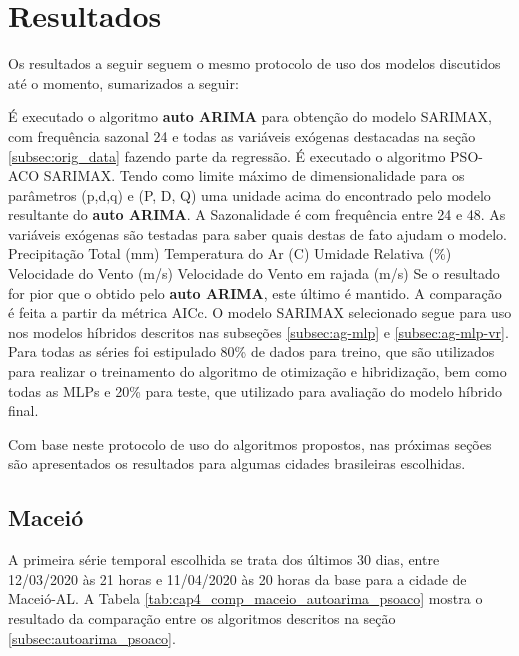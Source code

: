 \chapter{Resultados}
\label{cap:resultados}

Os resultados a seguir seguem o mesmo protocolo de uso dos modelos discutidos até o momento, sumarizados a seguir:

\begin{outline}[enumerate]
    \1 É executado o algoritmo \textbf{auto ARIMA} para obtenção do modelo SARIMAX, com frequência sazonal 24 e todas as variáveis exógenas destacadas na seção \ref{subsec:orig_data} fazendo parte da regressão.
    \1 É executado o algoritmo PSO-ACO SARIMAX.
        \2 Tendo como limite máximo de dimensionalidade para os parâmetros (p,d,q) e (P, D, Q) uma unidade acima do encontrado pelo modelo resultante do \textbf{auto ARIMA}.
        \2 A Sazonalidade é com frequência entre 24 e 48.
        \2 As variáveis exógenas são testadas para saber quais destas de fato ajudam o modelo.
            \3 Precipitação Total (mm)
            \3 Temperatura do Ar (\textdegree{}C)
            \3 Umidade Relativa (\%)
            \3 Velocidade do Vento (m/s)
            \3 Velocidade do Vento em rajada (m/s)
        \2 Se o resultado for pior que o obtido pelo \textbf{auto ARIMA}, este último é mantido. A comparação é feita a partir da métrica AICc.
    \1 O modelo SARIMAX selecionado segue para uso nos modelos híbridos descritos nas subseções \ref{subsec:ag-mlp} e \ref{subsec:ag-mlp-vr}.
        \2 Para todas as séries foi estipulado 80\% de dados para treino, que são utilizados para realizar o treinamento do algoritmo de otimização e hibridização, bem como todas as MLPs e 20\% para teste, que utilizado para avaliação do modelo híbrido final.
\end{outline}

Com base neste protocolo de uso do algoritmos propostos, nas próximas seções são apresentados os resultados para algumas cidades brasileiras escolhidas.

\section{Maceió}

A primeira série temporal escolhida se trata dos últimos 30 dias, entre 12/03/2020 às 21 horas e 11/04/2020 às 20 horas da base para a cidade de Maceió-AL. A Tabela \ref{tab:cap4_comp_maceio_autoarima_psoaco} mostra o resultado da comparação entre os algoritmos descritos na seção \ref{subsec:autoarima_psoaco}. 

